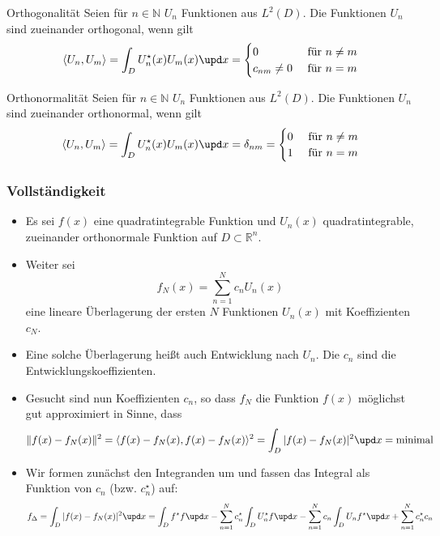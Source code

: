     \begin{frame}
    \begin{block}{Orthogonalität}
      Seien für $n \in \mathbb{N}$ $U_n$ Funktionen aus $L^2(D)$. Die Funktionen $U_n$ sind zueinander \alert{orthogonal}, wenn gilt
      $$
      \langle U_n, U_m\rangle = \int_D U_n^\star (x) U_m(x) \upd x =
      \begin{cases}
        0  & \text{ für } n\ne m \\
        c_{nm}\neq 0 & \text{ für } n = m
        \end{cases}
        $$
    \end{block}\pause
    \begin{block}{Orthonormalität}
      Seien für $n \in \mathbb{N}$ $U_n$ Funktionen aus $L^2(D)$. Die Funktionen $U_n$ sind zueinander \alert{orthonormal}, wenn gilt
      $$
      \langle U_n, U_m\rangle = \int_D U_n^\star (x) U_m(x) \upd x = \delta_{nm} =
      \begin{cases}
        0  & \text{ für } n\ne m \\
        1 & \text{ für } n = m
        \end{cases}
        $$
    \end{block}\pause

    
  \end{frame}
  \begin{frame}
    \frametitle{Vollständigkeit}
    \begin{itemize}[<+->]
    \item Es sei $f(x)$ eine quadratintegrable Funktion und $U_n(x)$ quadratintegrable, zueinander orthonormale Funktion auf $D \subset \mathbb{R}^n$.
    \item Weiter sei
      $$
      f_N(x) = \sum_{n=1}^N c_n U_n(x) 
      $$
      eine \alert{lineare Überlagerung} der ersten $N$ Funktionen $U_n(x)$ mit Koeffizienten $c_N$.
    \item Eine solche Überlagerung heißt auch \alert{Entwicklung nach $U_n$}. Die $c_n$ sind die \alert{Entwicklungskoeffizienten}.
    \item Gesucht sind nun Koeffizienten $c_n$, so dass $f_N$ die Funktion $f(x)$ \alert{möglichst gut approximiert} in Sinne, dass
      $$
      \| f(x) - f_N(x)\|^2 = \langle f(x) - f_N(x), f(x) - f_N(x) \rangle^2 = \int_D |f(x) - f_N(x)|^2 \upd x = \text{minimal}
      $$
    \item Wir formen zunächst den Integranden um und fassen das Integral als Funktion von $c_n$ (bzw. $c_n^\star$) auf: 
      $$
      f_\Delta =\int_D |f(x) - f_N(x)|^2 \upd x = \int_D f^\star f \upd x -\sum_{n=1}^N c_n^\star \int_D U_n^\star f \upd x -\sum_{n=1}^N c_n \int_D U_n f^\star \upd x + \sum_{n=1}^N c_n^\star c_n
      $$
      \end{itemize}
    \end{frame}

